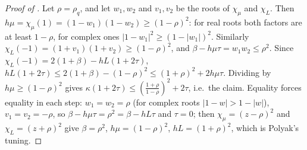 \documentclass[11pt]{article}
\theoremstyle{definition}
\theoremstyle{remark}
\begin{document}
\begin{proof}[Proof of ]
Let \(\rho=\rho_q\), and let \(w_1,w_2\) and \(v_1,v_2\) be the roots of \(\chi_\mu\) and
\(\chi_L\).  Then \(h\mu=\chi_\mu(1)=(1-w_1)(1-w_2)\ge(1-\rho)^2\): for real roots both
factors are at least \(1-\rho\), for complex ones \(|1-w_1|^2\ge(1-|w_1|)^2\).
Similarly \(\chi_L(-1)=(1+v_1)(1+v_2)\ge(1-\rho)^2\), and \(\beta-h\mu\tau=w_1w_2\le\rho^2\).
Since \(\chi_L(-1)=2(1+\beta)-hL(1+2\tau)\),
\(hL(1+2\tau)\le2(1+\beta)-(1-\rho)^2\le(1+\rho)^2+2h\mu\tau\).  Dividing by
\(h\mu\ge(1-\rho)^2\) gives \(\kappa(1+2\tau)\le(\frac{1+\rho}{1-\rho})^2+2\tau\), i.e.\ the
claim.  Equality forces equality in each step: \(w_1=w_2=\rho\) (for complex roots
\(|1-w|>1-|w|\)), \(v_1=v_2=-\rho\), so \(\beta-h\mu\tau=\rho^2=\beta-hL\tau\) and \(\tau=0\);
then \(\chi_\mu=(z-\rho)^2\) and \(\chi_L=(z+\rho)^2\) give \(\beta=\rho^2\),
\(h\mu=(1-\rho)^2\), \(hL=(1+\rho)^2\), which is Polyak's tuning.
\end{proof}
\end{document}
